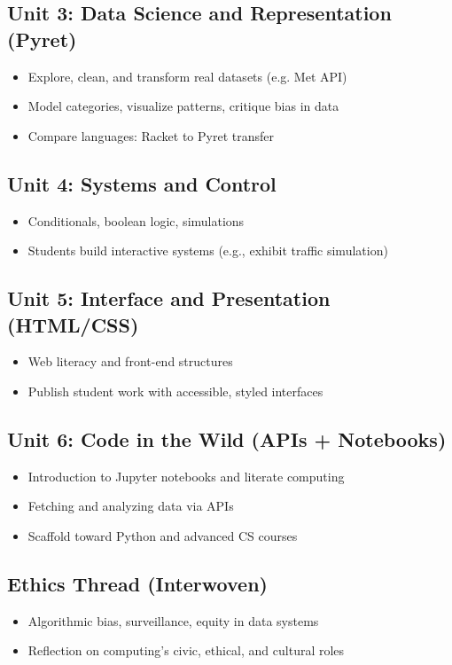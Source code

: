 \documentclass[11pt]{article}
\begin{document}
\subsection*{Unit 3: Data Science and Representation (Pyret)}
\begin{itemize}[noitemsep]
  \item Explore, clean, and transform real datasets (e.g. Met API)
  \item Model categories, visualize patterns, critique bias in data
  \item Compare languages: Racket to Pyret transfer
\end{itemize}

\subsection*{Unit 4: Systems and Control}
\begin{itemize}[noitemsep]
  \item Conditionals, boolean logic, simulations
  \item Students build interactive systems (e.g., exhibit traffic simulation)
\end{itemize}

\subsection*{Unit 5: Interface and Presentation (HTML/CSS)}
\begin{itemize}[noitemsep]
  \item Web literacy and front-end structures
  \item Publish student work with accessible, styled interfaces
\end{itemize}

\subsection*{Unit 6: Code in the Wild (APIs + Notebooks)}
\begin{itemize}[noitemsep]
  \item Introduction to Jupyter notebooks and literate computing
  \item Fetching and analyzing data via APIs
  \item Scaffold toward Python and advanced CS courses
\end{itemize}

\subsection*{Ethics Thread (Interwoven)}
\begin{itemize}[noitemsep]
  \item Algorithmic bias, surveillance, equity in data systems
  \item Reflection on computing's civic, ethical, and cultural roles
\end{itemize}
\end{document}
